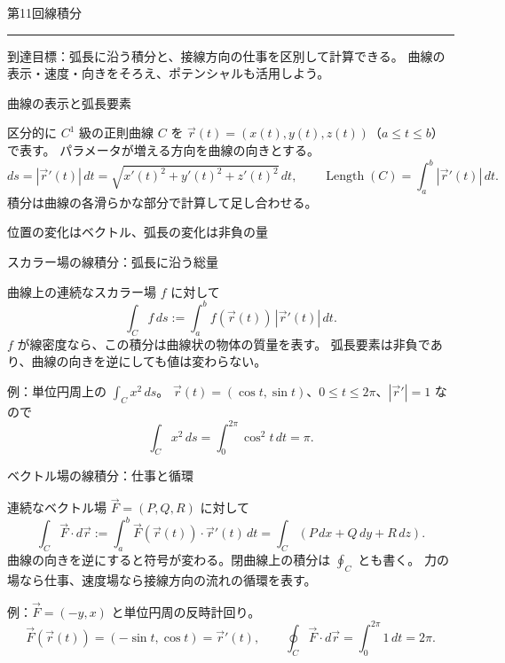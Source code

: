 \documentclass[a4paper,10pt,pdflatex,ja=standard,jafont=ipaex-type1,
  magstyle=real,scale=1]{bxjsarticle}
\newcommand{\handoutnumber}{11}
\newcommand{\handouttitle}[1]{%
  \begin{center}
    {\Large\color{ink}#1}\par\vspace{3mm}
    {\color{accent}\rule{0.88\linewidth}{0.7pt}}
  \end{center}\vspace{-2mm}}
\newcommand{\handout}[2]{%
  \renewcommand{\handoutnumber}{#1}%
  \handouttitle{第#1回\quad #2}}
\newcommand{\topic}[1]{\par\vspace{5pt}%
  {\large\sffamily\mdseries\color{accent}#1}\par\vspace{2pt}}
\newcommand{\keybox}[1]{\par\vspace{3pt}\begingroup
  \setlength{\fboxsep}{4pt}%
  \colorbox{soft}{\parbox{\dimexpr\linewidth-2\fboxsep\relax}{\small #1}}%
  \endgroup\par\vspace{2pt}}
\newcommand{\examplelabel}[1]{{\sffamily\mdseries\color{ink}#1}}
\begin{document}
\fontsize{10pt}{13.5pt}\selectfont
\setlength{\abovedisplayskip}{4pt}
\setlength{\belowdisplayskip}{4pt}
\handout{11}{線積分}
\keybox{到達目標：弧長に沿う積分と、接線方向の仕事を区別して計算できる。
曲線の表示・速度・向きをそろえ、ポテンシャルも活用しよう。}

\topic{曲線の表示と弧長要素}
区分的に $C^1$ 級の正則曲線 $C$ を
$\vec r(t)=(x(t),y(t),z(t))$（$a\le t\le b$）で表す。
パラメータが増える方向を曲線の向きとする。
$$
 ds=|\vec r'(t)|\,dt
 =\sqrt{x'(t)^2+y'(t)^2+z'(t)^2}\,dt,\qquad
 \operatorname{Length}(C)=\int_a^b|\vec r'(t)|\,dt.
$$
積分は曲線の各滑らかな部分で計算して足し合わせる。


\par\vspace{2pt}\noindent
\begin{minipage}[b]{0.98\linewidth}\centering
{}\par
{\small\color{muted}位置の変化はベクトル、弧長の変化は非負の量}\par
\end{minipage}
\par\vspace{2pt}

\topic{スカラー場の線積分：弧長に沿う総量}
曲線上の連続なスカラー場 $f$ に対して
$$
 \int_Cf\,ds:=\int_a^bf(\vec r(t))\,|\vec r'(t)|\,dt.
$$
$f$ が線密度なら、この積分は曲線状の物体の質量を表す。
弧長要素は非負であり、曲線の向きを逆にしても値は変わらない。
\par\examplelabel{例：単位円周上の $\int_Cx^2\,ds$。}
$\vec r(t)=(\cos t,\sin t)$、$0\le t\le2\pi$、$|\vec r'|=1$ なので
$$
 \int_Cx^2\,ds=\int_0^{2\pi}\cos^2t\,dt=\pi.
$$


\topic{ベクトル場の線積分：仕事と循環}
連続なベクトル場 $\vec F=(P,Q,R)$ に対して
$$
 \int_C\vec F\cdot d\vec r
 :=\int_a^b\vec F(\vec r(t))\cdot\vec r'(t)\,dt
 =\int_C(P\,dx+Q\,dy+R\,dz).
$$
曲線の向きを逆にすると符号が変わる。閉曲線上の積分は $\oint_C$ とも書く。
力の場なら仕事、速度場なら接線方向の流れの循環を表す。
\par\examplelabel{例：$\vec F=(-y,x)$ と単位円周の反時計回り。}
$$
 \vec F(\vec r(t))=(-\sin t,\cos t)=\vec r'(t),\qquad
 \oint_C\vec F\cdot d\vec r=\int_0^{2\pi}1\,dt=2\pi.
$$
\end{document}
